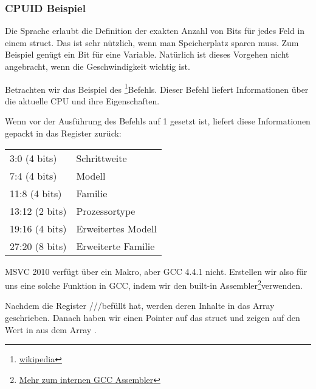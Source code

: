 \subsubsection{CPUID Beispiel}
Die Sprache \CCpp erlaubt die Definition der exakten Anzahl von Bits für jedes Feld in einem struct.
Das ist sehr nützlich, wenn man Speicherplatz sparen muss.
Zum Beispiel genügt ein Bit für eine \Tbool Variable.
Natürlich ist dieses Vorgehen nicht angebracht, wenn die Geschwindigkeit wichtig ist.


\newcommand{\FNCPUID}{\footnote{\href{http://go.yurichev.com/17069}{wikipedia}}}

\label{cpuid}
Betrachten wir das Beispiel des \CPUID\FNCPUID Befehls.
Dieser Befehl liefert Informationen über die aktuelle CPU und ihre Eigenschaften.

Wenn \EAX vor der Ausführung des Befehls auf 1 gesetzt ist, liefert \CPUID diese Informationen gepackt in das \EAX
Register zurück:

\begin{center}
\begin{tabular}{ | l | l | }
\hline
3:0 (4 bits)& Schrittweite \\
7:4 (4 bits) & Modell \\
11:8 (4 bits) & Familie \\
13:12 (2 bits) & Prozessortype \\
19:16 (4 bits) & Erweitertes Modell \\
27:20 (8 bits) & Erweiterte Familie \\
\hline
\end{tabular}
\end{center}

\newcommand{\FNGCCAS}{\footnote{\href{http://go.yurichev.com/17070}
{Mehr zum internen GCC Assembler}}}
MSVC 2010 verfügt über ein \CPUID Makro, aber GCC 4.4.1 nicht.
Erstellen wir also für uns eine solche Funktion in GCC, indem wir den built-in Assembler\FNGCCAS verwenden.


Nachdem \CPUID die Register \EAX/\EBX/\ECX/\EDX befüllt hat, werden deren Inhalte in das Array  geschrieben.
Danach haben wir einen Pointer auf das  struct und zeigen auf den Wert in \EAX aus dem Array .

